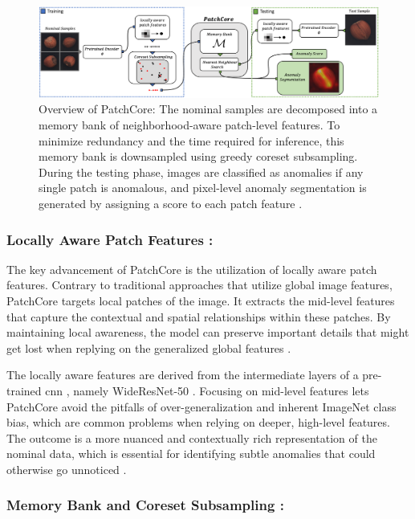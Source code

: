 \begin{figure}[ht!]
    \centering
    \includegraphics[width=1.1\textwidth]{Rohit_Master_Thesis//Images/patchcore_architecture_figure.png}
    \caption{Overview of PatchCore: The nominal samples are decomposed into a memory bank of neighborhood-aware patch-level features. To minimize redundancy and the time required for inference, this memory bank is downsampled using greedy coreset subsampling. During the testing phase, images are classified as anomalies if any single patch is anomalous, and pixel-level anomaly segmentation is generated by assigning a score to each patch feature \cite{roth2022totalrecallindustrialanomaly}.}
    \label{fig:patchcore architecture}
\end{figure}

\subsubsection*{Locally Aware Patch Features :} 
The key advancement of PatchCore is the utilization of locally aware patch features. Contrary to traditional approaches that utilize global image features, PatchCore targets local patches of the image. It extracts the mid-level features that capture the contextual and spatial relationships within these patches. By maintaining local awareness, the model can preserve important details that might get lost when replying on the generalized global features \cite{roth2022totalrecallindustrialanomaly}.

The locally aware features are derived from the intermediate layers of a pre-trained \gls{cnn} \cite{726791}, namely WideResNet-50 \cite{zagoruyko2017wideresidualnetworks}. Focusing on mid-level features lets PatchCore avoid the pitfalls of over-generalization and inherent ImageNet class bias, which are common problems when relying on deeper, high-level features. The outcome is a more nuanced and contextually rich representation of the nominal data, which is essential for identifying subtle anomalies that could otherwise go unnoticed \cite{roth2022totalrecallindustrialanomaly}.

\subsubsection*{Memory Bank and Coreset Subsampling :}

